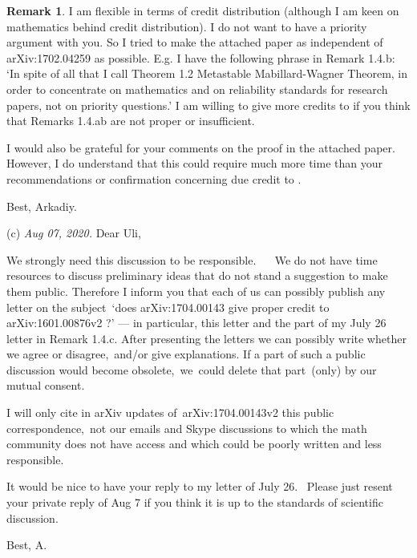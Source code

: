 \documentclass[12pt]{article}
\theoremstyle{plain}
\theoremstyle{definition}
\newtheorem{Remark}[Theorem]{Remark}
\begin{document}
{\begin{Remark}
I am flexible in terms of credit distribution
(although I am keen on mathematics behind credit distribution).
I do not want to have a priority argument with you.
So I tried to make the attached paper as independent of arXiv:1702.04259 as possible.
E.g. I have the following phrase in Remark 1.4.b:
`In spite of all that I call Theorem 1.2 Metastable Mabillard-Wagner Theorem, in order to concentrate
on mathematics and on reliability standards for research papers, not on priority questions.'
I am willing to give more credits to \cite{MW16} if you think that Remarks 1.4.ab are not proper or insufficient.

I would also be grateful for your comments on the proof in the attached paper.
However, I do understand that this could require much more time than
your recommendations or confirmation concerning due credit to \cite{MW16}.


Best, Arkadiy.

(c) {\it Aug 07, 2020.} Dear Uli, 

We strongly need this discussion to be responsible.   
We do not have time resources to discuss preliminary ideas that do not stand a suggestion to make them public.
Therefore I inform you that each of us can possibly publish any letter on the subject `does arXiv:1704.00143 give proper credit to arXiv:1601.00876v2 ?' --- in particular, this letter and the part of my July 26 letter in Remark 1.4.c.
After presenting the letters we can possibly write whether we agree or disagree, and/or give explanations.
If a part of such a public discussion would become obsolete, we could delete that part (only) by our mutual consent. 

I will only cite in arXiv updates of arXiv:1704.00143v2 this public correspondence, not our emails and Skype discussions to which the math community does not have access and which could be poorly written and less responsible. 

It would be nice to have your reply to my letter of July 26. 
Please just resent your private reply of Aug 7 if you think it is up to the standards of scientific discussion.

Best, A. 
\end{Remark}

}
\end{document}
